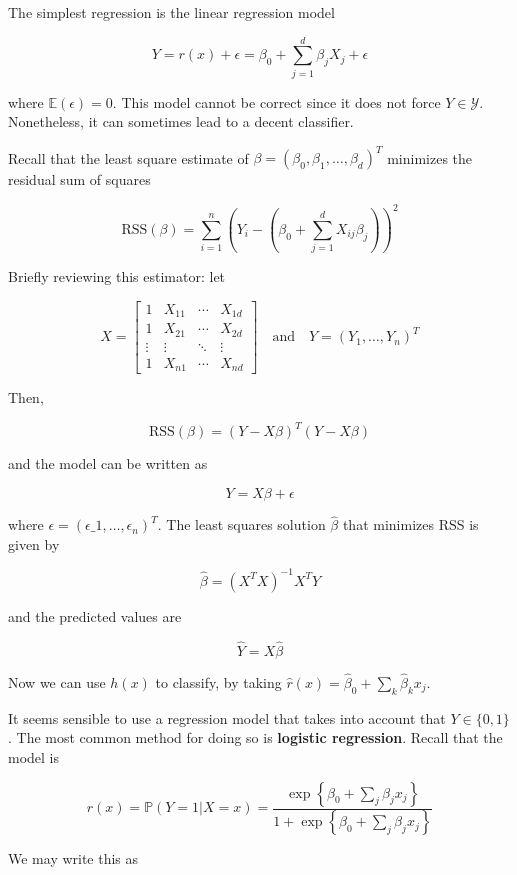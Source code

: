 The simplest regression is the linear regression model

\[ Y = r(x) + \epsilon = \beta_{0} + \sum_{j=1}^{d} \beta_{j} X_{j} + \epsilon \]

where \(\mathbb{E}(\epsilon) = 0\). This model cannot be correct since it
does not force \(Y \in \mathcal{Y}\). Nonetheless, it can sometimes lead
to a decent classifier.

Recall that the least square estimate of
\(\beta = (\beta_{0}, \beta_{1}, \dots, \beta_d)^T\) minimizes the residual
sum of squares

\[ \text{RSS}(\beta) = \sum_{i=1}^{n} \left( Y_{i} - \left( \beta_{0}  + \sum_{j=1}^{d} X_{ij} \beta_{j} \right) \right)^{2} \]

Briefly reviewing this estimator: let

\[ 
X = \begin{bmatrix}
1 & X_{11} & \cdots & X_{1d} \\
1 & X_{21} & \cdots & X_{2d} \\
\vdots & \vdots & \ddots & \vdots \\
1 & X_{n1} & \cdots & X_{nd}
\end{bmatrix}
\quad \text{and} \quad
Y = (Y_{1}, \dots, Y_{n})^T
\]

Then,

\[ \text{RSS}(\beta) = (Y - X \beta)^T (Y - X \beta) \]

and the model can be written as

\[ Y = X \beta + \epsilon \]

where $ \epsilon = (\epsilon\_{1}, \dots, \epsilon_{n})^{T}$. The least
squares solution \(\hat{\beta}\) that minimizes RSS is given by

\[ \hat{\beta} = (X^T X)^{-1} X^T Y \]

and the predicted values are

\[ \hat{Y} = X \hat{\beta} \]

Now we can use \(h(x)\) to classify, by taking
\(\hat{r}(x) = \hat{\beta}_{0} + \sum_{k} \hat{\beta}_{k} x_{j}\).

It seems sensible to use a regression model that takes into account that
\(Y \in \{ 0, 1 \}\). The most common method for doing so is
\textbf{logistic regression}. Recall that the model is

\[ r(x) = \mathbb{P}(Y = 1 | X = x) = \frac{\exp \left\{ \beta_{0} + \sum_{j} \beta_{j} x_{j} \right\} }{1 + \exp \left\{ \beta_{0} + \sum_{j} \beta_{j} x_{j} \right\} } \]

We may write this as

